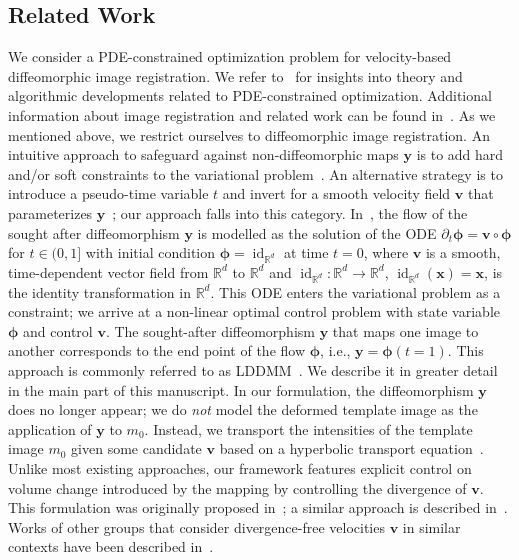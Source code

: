 \documentclass[11pt]{amsart}
\renewcommand{\vec}[1]{\ensuremath{\boldsymbol{#1}}}
\begin{document}
\subsection{Related Work}

We consider a PDE-constrained optimization problem for velocity-based diffeomorphic image registration. We refer to~\cite{Biegler:2003a,Borzi:2012a,Gunzburger:2003a,Hinze:2009a,Antil:2018a,Lions:1971a} for insights into theory and algorithmic developments related to PDE-constrained optimization. Additional information about image registration and related work can be found in~\cite{Modersitzki:2004a,Fischer:2008a,Modersitzki:2009a,Hajnal:2001a,Sotiras:2013a,Younes:2019a}. As we mentioned above, we restrict ourselves to diffeomorphic image registration. An intuitive approach to safeguard against non-diffeomorphic maps $\vec{y}$ is to add hard and/or soft constraints to the variational problem~\cite{Burger:2013a,Haber:2007a,Rohlfing:2003a,Sdika:2008a}. An alternative strategy is to introduce a pseudo-time variable $t$ and invert for a smooth velocity field $\vec{v}$ that parameterizes $\vec{y}$~\cite{Younes:2019a,Younes:2020a,Beg:2005a,Dupuis:1998a,Trouve:1998a,Miller:2001a,Vercauteren:2009a,Christensen:1996a,Younes:2007a}; our approach falls into this category. In~\cite{Beg:2005a,Dupuis:1998a,Trouve:1995a,Trouve:1998a,Miller:2001a,Younes:2007a}, the flow of the sought after diffeomorphism $\vec{y}$ is modelled as the solution of the ODE $\partial_t \vec{\phi} = \vec{v} \circ \vec{\phi}$ for $t \in (0,1]$ with initial condition $\vec{\phi} = \operatorname{id}_{\mathbb{R}^d}$ at time $t = 0$, where $\vec{v}$ is a smooth, time-dependent vector field from $\mathbb{R}^d$ to $\mathbb{R}^d$ and $\operatorname{id}_{\mathbb{R}^d} : \mathbb{R}^d \to \mathbb{R}^d$, $\operatorname{id}_{\mathbb{R}^d}(\vec{x}) = \vec{x}$, is the identity transformation in $\mathbb{R}^d$. This ODE enters the variational problem as a constraint; we arrive at a non-linear optimal control problem with state variable $\vec{\phi}$ and control $\vec{v}$. The sought-after diffeomorphism $\vec{y}$ that maps one image to another corresponds to the end point of the flow $\vec{\phi}$, i.e., $\vec{y} = \vec{\phi}(t=1)$. This approach is commonly referred to as LDDMM~\cite{Beg:2005a}. We describe it in greater detail in the main part of this manuscript. In our formulation, the diffeomorphism $\vec{y}$ does no longer appear; we do \emph{not} model the deformed template image as the application of $\vec{y}$ to $m_0$. Instead, we transport the intensities of the template image $m_0$ given some candidate $\vec{v}$ based on a hyperbolic transport equation~\cite{Mang:2015a,Hart:2009a,Borzi:2002a}. Unlike most existing approaches, our framework features explicit control on volume change introduced by the mapping by controlling the divergence of $\vec{v}$. This formulation was originally proposed in~\cite{Mang:2016a}; a similar approach is described in~\cite{Borzi:2002a}. Works of other groups that consider divergence-free velocities $\vec{v}$ in similar contexts have been described in~\cite{Chen:2011a,Hinkle:2009a,Mansi:2011a,Ruhnau:2007a,Saddi:2008a}.
\end{document}
